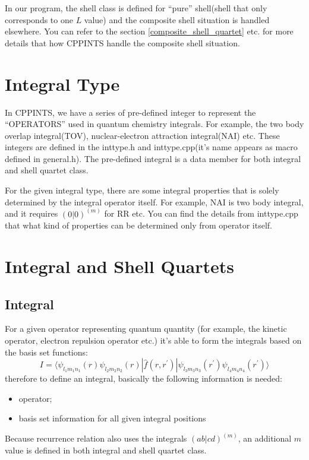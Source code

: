 In our program, the shell class is defined for ``pure'' shell(shell that
only corresponds to one $L$ value) and the composite shell situation is 
handled elsewhere. You can refer to the section \ref{composite_shell_quartet} 
etc. for more details that how CPPINTS handle the composite shell situation.

\section{Integral Type}
%
%
\label{inttype}

In CPPINTS, we have a series of pre-defined integer to represent 
the ``OPERATORS'' used in quantum chemistry integrals. For example,
the two body overlap integral(TOV), nuclear-electron attraction integral(NAI)
etc. These integers are defined in the inttype.h and inttype.cpp(it's 
name appears as macro defined in general.h). The pre-defined integral 
is a data member for both integral and shell quartet class.

For the given integral type, there are some integral properties that 
is solely determined by the integral operator itself. For example,
NAI is two body integral, and it requires $(0|0)^{(m)}$ for RR etc.
You can find the details from inttype.cpp that what kind of properties 
can be determined only from operator itself.

\section{Integral and Shell Quartets}
%
% 
%
\subsection{Integral}
\label{integral}
%
%
For a given operator representing quantum quantity (for example,
the kinetic operator, electron repulsion operator etc.) it's able 
to form the integrals based on the basis set functions:
\begin{equation}
 I = \langle \psi_{l_{1}m_{1}n_{1}}(r)\psi_{l_{2}m_{2}n_{2}}(r)| 
 \hat{f}(r,r^{'})| \psi_{l_{3}m_{3}n_{3}}(r^{'})
 \psi_{l_{4}m_{4}n_{4}}(r^{'})\rangle
\end{equation}
therefore to define an integral, basically the following 
information is needed:
\begin{itemize}
 \item operator;
 \item basis set information for all given integral positions
\end{itemize}
Because recurrence relation also uses the integrals $(ab|cd)^{(m)}$,
an additional $m$ value is defined in both integral and shell
quartet class.

